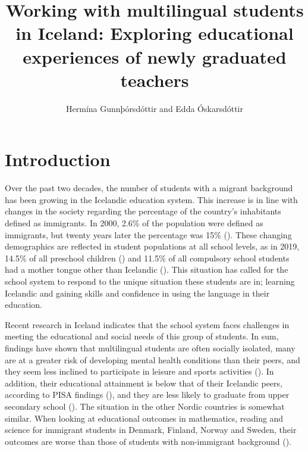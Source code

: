 \documentclass[output=paper]{langscibook}
\author{Hermína Gunnþórsdóttir\orcid{}\affiliation{University of Akureyri} and Edda Óskarsdóttir\orcid{}\affiliation{University of Iceland}}
\title[Working with multilingual students in Iceland]{Working with multilingual students in Iceland: Exploring educational experiences of newly graduated teachers}
\begin{document}
\maketitle 
\label{chap:2}



\section{Introduction} %

Over the past two decades, the number of students with a migrant background has been growing in the Icelandic education system. This increase is in line with changes in the society regarding the percentage of the country’s inhabitants defined as immigrants. In 2000, 2.6\% of the population were defined as immigrants, but twenty years later the percentage was 15\% (\citealt{Statistics_iceland2020-children}). These changing demographics are reflected in student populations at all school levels, as in 2019, 14.5\% of all preschool children (\citealt{Statistics_iceland2020-foreign}) and 11.5\% of all compulsory school students had a mother tongue other than Icelandic (\citealt{Statistics_iceland2020-children}). This situation has called for the school system to respond to the unique situation these students are in; learning Icelandic and gaining skills and confidence in using the language in their education.

Recent research in Iceland indicates that the school system faces challenges in meeting the educational and social needs of this group of students. In sum, findings have shown that multilingual students are often socially isolated, many are at a greater risk of developing mental health conditions than their peers, and they seem less inclined to participate in leisure and sports activities (\citealt{Gumundsdottir2013, Ministry_of_education_science_and_culture2020-3, Runarsdottir2015-1, Orisdottir2018-1}). In addition, their educational attainment is below that of their Icelandic peers, according to PISA findings (\citealt{Oecd2019-1}), and they are less likely to graduate from upper secondary school (\citealt{RagnarsdottirLefever2018}). The situation in the other Nordic countries is somewhat similar. When looking at educational outcomes in mathematics, reading and science for immigrant students in Denmark, Finland, Norway and Sweden, their outcomes are worse than those of students with non-immigrant background (\citealt{Torslev2017}).
\end{document}
